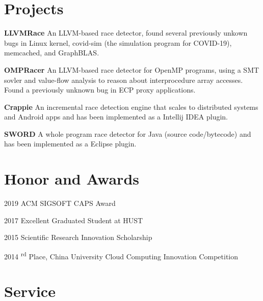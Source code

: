 \documentclass[12pt,letterpaper]{report}
\newcommand{\listtabwidth}{1.75cm}
\begin{document}
	\section*{Projects}
	
	\begin{tablist}
		\item[\textbf{LLVMRace}]
		\tab An LLVM-based race detector, found several previously unkown bugs in Linux kernel, covid-sim (the simulation program for COVID-19), memcached, and GraphBLAS.
		\item[\textbf{OMPRacer}] 
		\tab An LLVM-based race detector for OpenMP programs, 
		using a SMT sovler and value-flow analysis to reason about interprocedure array accesses.\\
		Found a previously unknown bug in ECP proxy applications.
		\item[\textbf{Crappie}] 
		\tab An incremental race detection engine that scales to distributed systems and Android apps and has been implemented as a Intellij IDEA plugin.
		\item[\textbf{SWORD}] 
		\tab A whole program race detector for Java (source code/bytecode) and has been implemented as a Eclipse plugin.
	\end{tablist}
\renewcommand{\listtabwidth}{1.75cm}


\section*{Honor and Awards}

\begin{tablist}
	\item[2019] \tab ACM SIGSOFT CAPS Award
	\item[2017] \tab Excellent Graduated Student at HUST
	\item[2015] \tab Scientific Research Innovation Scholarship
	\item[2014] \textsuperscript{rd} Place, China University Cloud Computing Innovation Competition
\end{tablist}


	
	\section*{Service}
	
\end{document}
